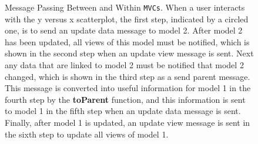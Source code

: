 \documentclass{article}[11pt]
\newcommand{\Rfunction}[1]{{\textbf{#1}}}
\newcommand{\Robject}[1]{{\texttt{#1}}}
\begin{document}
\begin{figure}[ht]
  \begin{center}
    \caption{ Message Passing Between and Within \Robject{MVCs}.  When a user
      interacts with the y versus x scatterplot, the first step, indicated by
      a circled one, is to send an update data message to model 2.  After
      model 2 has been updated, all views of this model must be notified, which
      is shown in the second step when an update view message is sent.  Next
      any data that are linked to model 2 must be notified that model 2
      changed, which is shown in the third step as a send parent message.
      This message is converted into useful information for model 1 in
      the fourth step by the \Rfunction{toParent} function, and this
      information is sent to model 1 in the fifth step when an update data
      message is sent.  Finally, after model 1 is updated, an update view
      message is sent in the sixth step to update all views of model 1. }
    \label{Fig:MessPass}
  \end{center}
\end{figure}
\end{document}
